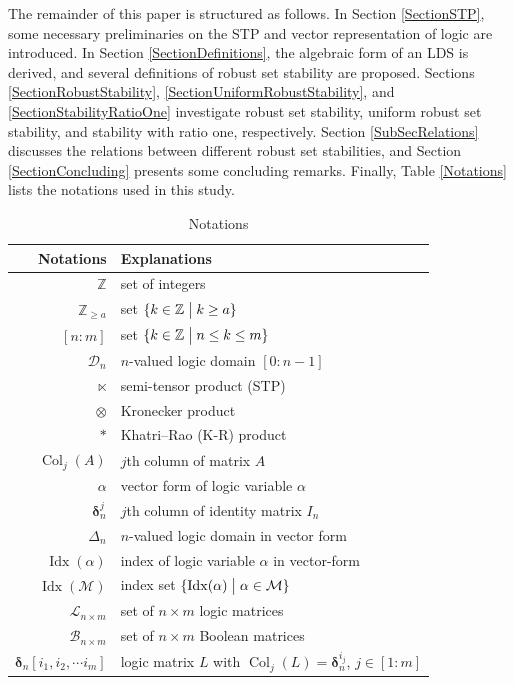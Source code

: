 \documentclass[11pt,onecolumn]{article}
\DeclareMathOperator{\col}{Col}
\DeclareMathOperator{\idx}{Idx}
\newcommand{\ddelta}{{\boldsymbol\delta}}
\begin{document}
The remainder of this paper is structured as follows. In Section \ref{SectionSTP}, some necessary preliminaries on the STP and vector representation of logic are introduced. In Section \ref{SectionDefinitions}, the algebraic form of an LDS is derived, and several definitions of robust set stability are proposed. Sections \ref{SectionRobustStability}, \ref{SectionUniformRobustStability}, and \ref{SectionStabilityRatioOne} investigate robust set stability, uniform robust set stability, and stability with ratio one, respectively. Section \ref{SubSecRelations} discusses the relations between different robust set stabilities, and Section \ref{SectionConcluding} presents some concluding remarks. Finally, Table \ref{Notations} lists the notations used in this study.



 \begin{table}[t]
\caption{Notations}
\renewcommand\arraystretch{1}
\begin{center}\footnotesize
\begin{tabular}{rl}
\toprule
Notations & Explanations\\
\midrule
$\mathbb Z$& set of integers\\
$\mathbb Z_{\geq a}$& set $\{k\in\mathbb Z\bigm | k\geq a\}$\\
$[n:m]$& set $\{k\in\mathbb Z\bigm | n\leq k\leq m\}$ \\
$\mathscr D_n$ & $n$-valued logic domain $[0:n-1]$\\
$\ltimes$ & semi-tensor product (STP)\\
$\otimes$ & Kronecker product\\
$*$ & Khatri--Rao (K-R) product\\
$\col_j(A)$ & $j$th column of matrix $A$\\
$ \alpha$ & vector form of logic variable $\alpha$ \\
$\ddelta_n^j$ & $j$th column of identity matrix $I_n$ \\
$\Delta_n$ & $n$-valued logic domain in vector form\\
$\idx( \alpha)$ & index of logic variable $ \alpha$ in vector-form\\
$\idx(\mathcal M)$ & index set $\{\idx( \alpha)\bigm|  \alpha\in\mathcal M\}$\\
$\mathscr L_{n\times m}$ & set of $n\times m$ logic matrices\\
$\mathscr B_{n\times m}$ & set of $n\times m$ Boolean matrices\\
$\ddelta_n[i_1,i_2,\cdots i_m]$ & logic matrix $L$ with $\col_j(L)=\ddelta_n^{i_j}$, $j\in[1:m]$ \\

\end{tabular}
\end{center}
\end{table}
\end{document}
